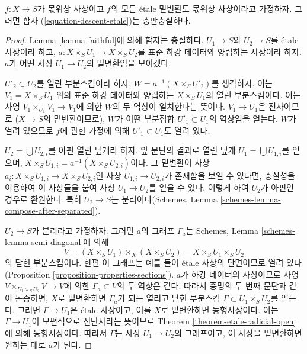 \begin{lemma}
\label{lemma-fully-faithful}
$f : X \to S$가 몫위상 사상이고 $f$의 모든 \'etale 밑변환도
몫위상 사상이라고 가정하자. 그러면 함자
(\ref{equation-descent-etale})는 충만충실하다.
\end{lemma}

\begin{proof}
Lemma \ref{lemma-faithful}에 의해 함자는 충실하다.
$U_1 \to S$와 $U_2 \to S$를 \'etale 사상이라 하고,
$a : X \times_S U_1 \to X \times_S U_2$를 표준 하강 데이터와
양립하는 사상이라 하자. $a$가 어떤 사상 $U_1 \to U_2$의
밑변환임을 보이겠다.

\medskip\noindent
$U'_2 \subset U_2$를 열린 부분스킴이라 하자.
$W = a^{-1}(X \times_S U'_2)$를 생각하자. 이는
$V_1 = X \times_S U_1$ 위의 표준 하강 데이터와 양립하는
$X \times_S U_1$의 열린 부분스킴이다. 이는 사영
$V_1 \times_{U_1} V_1 \to V_1$에 의한 $W$의 두 역상이
일치한다는 뜻이다. $V_1 \to U_1$은 전사이므로
($X \to S$의 밑변환이므로), $W$가 어떤 부분집합
$U'_1 \subset U_1$의 역상임을 얻는다. $W$가 열려 있으므로
$f$에 관한 가정에 의해 $U'_1 \subset U_1$도 열려 있다.

\medskip\noindent
$U_2 = \bigcup U_{2, i}$를 아핀 열린 덮개라 하자.
앞 문단의 결과로 열린 덮개 $U_1 = \bigcup U_{1, i}$를 얻으며,
$X \times_S U_{1, i} = a^{-1}(X \times_S U_{2, i})$이다.
그 밑변환이 사상
$a_i : X \times_S U_{1, i} \to X \times_S U_{2, i}$인
사상 $U_{1, i} \to U_{2, i}$가 존재함을 보일 수 있다면,
충실성을 이용하여 이 사상들을 붙여 사상 $U_1 \to U_2$를 얻을 수 있다.
이렇게 하여 $U_2$가 아핀인 경우로 환원한다. 특히
$U_2 \to S$는 분리이다(Schemes, Lemma
\ref{schemes-lemma-compose-after-separated}).

\medskip\noindent
$U_2 \to S$가 분리라고 가정하자. 그러면 $a$의 그래프
$\Gamma_a$는 Schemes, Lemma \ref{schemes-lemma-semi-diagonal}에 의해
$$
V = (X \times_S U_1) \times_X (X \times_S U_2) = X \times_S U_1 \times_S U_2
$$
의 닫힌 부분스킴이다. 한편 이 그래프는 예를 들어 \'etale 사상의
단면이므로 열려 있다(Proposition
\ref{proposition-properties-sections}). $a$가 하강 데이터의
사상이므로 사영
$V \times_{U_1 \times_S U_2} V \to V$에 의한
$\Gamma_a \subset V$의 두 역상은 같다. 따라서 증명의 두 번째
문단과 같이 논증하면, $X$로 밑변환하면 $\Gamma_a$가 되는
열리고 닫힌 부분스킴 $\Gamma \subset U_1 \times_S U_2$를 얻는다.
그러면 $\Gamma \to U_1$은 \'etale 사상이고, 이를 $X$로 밑변환하면
동형사상이다. 이는 $\Gamma \to U_1$이 보편적으로 전단사라는 뜻이므로
Theorem \ref{theorem-etale-radicial-open}에 의해 동형사상이다.
따라서 $\Gamma$는 사상 $U_1 \to U_2$의 그래프이고,
이 사상을 밑변환하면 원하는 대로 $a$가 된다.
\end{proof}

